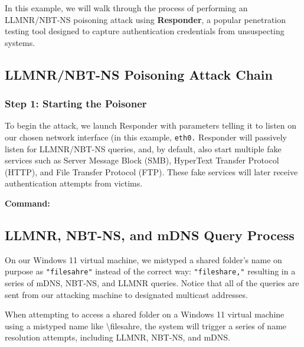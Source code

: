 In this example, we will walk through the process of performing an LLMNR/NBT-NS poisoning attack using \textbf{Responder},
 a popular penetration testing tool designed to capture authentication credentials from unsuspecting systems.

 \subsection{LLMNR/NBT-NS Poisoning Attack Chain}
 \subsubsection{Step 1: Starting the Poisoner}
 To begin the attack, we launch Responder with parameters telling it to listen on our chosen network interface (in this example, \texttt{eth0.} Responder will passively listen for LLMNR/NBT-NS queries, and, by default, also start multiple fake services such as Server Message Block (SMB), HyperText Transfer Protocol (HTTP), and File Transfer Protocol (FTP). These fake services will later receive authentication attempts from victims.

 \textbf{Command:}
 




\subsection{LLMNR, NBT-NS, and mDNS Query Process}

On our Windows 11 virtual machine, we mistyped a shared folder's name on purpose as \texttt{"filesahre"} instead of the correct way: \texttt{"fileshare,"} resulting in a series of mDNS, NBT-NS, and LLMNR queries. Notice that all of the queries are sent from our attacking machine to designated multicast addresses.

When attempting to access a shared folder on a Windows 11 virtual machine using a mistyped name like \textbackslash{}filesahre, the system will trigger a series of name resolution attempts, including LLMNR, NBT-NS, and mDNS. 

